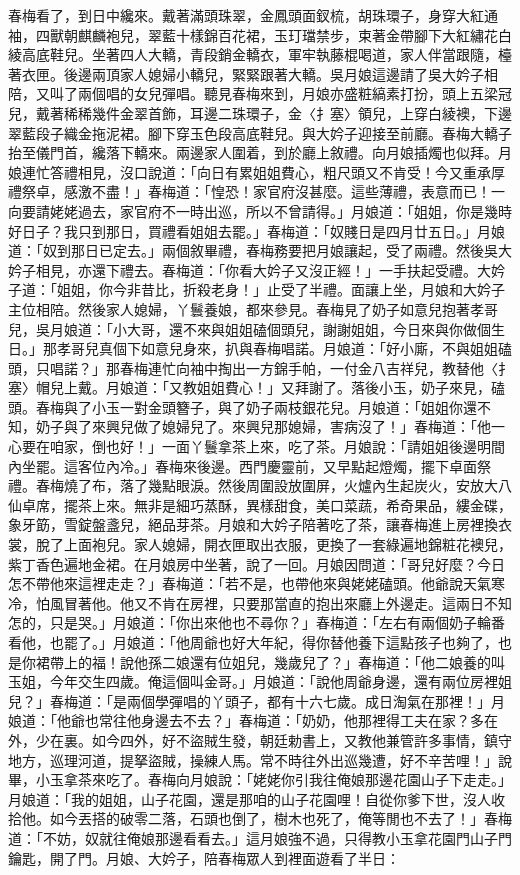 \begin{showcontents}{}
春梅看了，到日中纔來。戴著滿頭珠翠，金鳳頭面釵梳，胡珠環子，身穿大紅通袖，四獸朝麒麟袍兒，翠藍十樣錦百花裙，玉玎璫禁步，束著金帶腳下大紅繡花白綾高底鞋兒。坐著四人大轎，青段銷金轎衣，軍牢執藤棍喝道，家人伴當跟隨，檯著衣匣。後邊兩頂家人媳婦小轎兒，緊緊跟著大轎。吳月娘這邊請了吳大妗子相陪，又叫了兩個唱的女兒彈唱。聽見春梅來到，月娘亦盛粧縞素打扮，頭上五梁冠兒，戴著稀稀幾件金翠首飾，耳邊二珠環子，金〈扌塞〉領兒，上穿白綾襖，下邊翠藍段子織金拖泥裙。腳下穿玉色段高底鞋兒。與大妗子迎接至前廳。春梅大轎子抬至儀門首，纔落下轎來。兩邊家人圍着，到於廳上敘禮。向月娘插燭也似拜。月娘連忙答禮相見，沒口說道：「向日有累姐姐費心，粗尺頭又不肯受！今又重承厚禮祭卓，感激不盡！」春梅道：「惶恐！家官府沒甚麼。這些薄禮，表意而已！一向要請姥姥過去，家官府不一時出巡，所以不曾請得。」月娘道：「姐姐，你是幾時好日子？我只到那日，買禮看姐姐去罷。」春梅道：「奴賤日是四月廿五日。」月娘道：「奴到那日已定去。」兩個敘畢禮，春梅務要把月娘讓起，受了兩禮。然後吳大妗子相見，亦還下禮去。春梅道：「你看大妗子又沒正經！」一手扶起受禮。大妗子道：「姐姐，你今非昔比，折殺老身！」止受了半禮。面讓上坐，月娘和大妗子主位相陪。然後家人媳婦，丫鬟養娘，都來參見。春梅見了奶子如意兒抱著孝哥兒，吳月娘道：「小大哥，還不來與姐姐磕個頭兒，謝謝姐姐，今日來與你做個生日。」那孝哥兒真個下如意兒身來，扒與春梅唱諾。月娘道：「好小廝，不與姐姐磕頭，只唱諾？」那春梅連忙向袖中掏出一方錦手帕，一付金八吉祥兒，教替他〈扌塞〉帽兒上戴。月娘道：「又教姐姐費心！」又拜謝了。落後小玉，奶子來見，磕頭。春梅與了小玉一對金頭簪子，與了奶子兩枝銀花兒。月娘道：「姐姐你還不知，奶子與了來興兒做了媳婦兒了。來興兒那媳婦，害病沒了！」春梅道：「他一心要在咱家，倒也好！」一面丫鬟拿茶上來，吃了茶。月娘說：「請姐姐後邊明間內坐罷。這客位內冷。」春梅來後邊。西門慶靈前，又早點起燈燭，擺下卓面祭禮。春梅燒了布，落了幾點眼淚。然後周圍設放圍屏，火爐內生起炭火，安放大八仙卓席，擺茶上來。無非是細巧蒸酥，異樣甜食，美口菜蔬，希奇果品，縷金碟，象牙筯，雪錠盤盞兒，絕品芽茶。月娘和大妗子陪著吃了茶，讓春梅進上房裡換衣裳，脫了上面袍兒。家人媳婦，開衣匣取出衣服，更換了一套綠遍地錦粧花襖兒，紫丁香色遍地金裙。在月娘房中坐著，說了一回。月娘因問道：「哥兒好麼？今日怎不帶他來這裡走走？」春梅道：「若不是，也帶他來與姥姥磕頭。他爺說天氣寒冷，怕風冒著他。他又不肯在房裡，只要那當直的抱出來廳上外邊走。這兩日不知怎的，只是哭。」月娘道：「你出來他也不尋你？」春梅道：「左右有兩個奶子輪番看他，也罷了。」月娘道：「他周爺也好大年紀，得你替他養下這點孩子也夠了，也是你裙帶上的福！說他孫二娘還有位姐兒，幾歲兒了？」春梅道：「他二娘養的叫玉姐，今年交生四歲。俺這個叫金哥。」月娘道：「說他周爺身邊，還有兩位房裡姐兒？」春梅道：「是兩個學彈唱的丫頭子，都有十六七歲。成日淘氣在那裡！」月娘道：「他爺也常往他身邊去不去？」春梅道：「奶奶，他那裡得工夫在家？多在外，少在裏。如今四外，好不盜賊生發，朝廷勅書上，又教他兼管許多事情，鎮守地方，巡理河道，提拏盜賊，操練人馬。常不時往外出巡幾遭，好不辛苦哩！」說畢，小玉拿茶來吃了。春梅向月娘說：「姥姥你引我往俺娘那邊花園山子下走走。」月娘道：「我的姐姐，山子花園，還是那咱的山子花園哩！自從你爹下世，沒人收拾他。如今丟搭的破零二落，石頭也倒了，樹木也死了，俺等閒也不去了！」春梅道：「不妨，奴就往俺娘那邊看看去。」這月娘強不過，只得教小玉拿花園門山子門鑰匙，開了門。月娘、大妗子，陪春梅眾人到裡面遊看了半日：


\end{showcontents}
